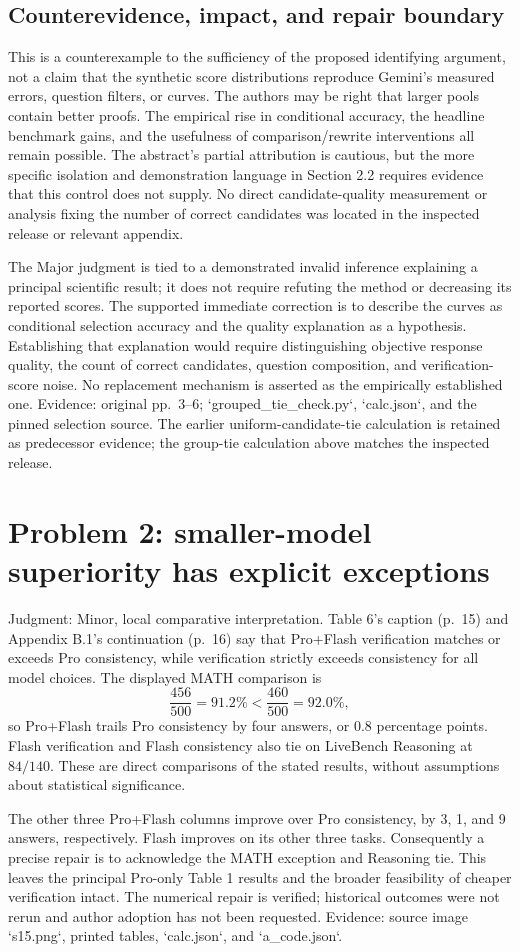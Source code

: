 \documentclass[10pt]{article}
\begin{document}
\subsection*{Counterevidence, impact, and repair boundary}
This is a counterexample to the sufficiency of the proposed identifying argument, not a claim that the synthetic score distributions reproduce Gemini’s measured errors, question filters, or curves. The authors may be right that larger pools contain better proofs. The empirical rise in conditional accuracy, the headline benchmark gains, and the usefulness of comparison/rewrite interventions all remain possible. The abstract’s partial attribution is cautious, but the more specific isolation and demonstration language in Section 2.2 requires evidence that this control does not supply. No direct candidate-quality measurement or analysis fixing the number of correct candidates was located in the inspected release or relevant appendix.\par
The Major judgment is tied to a demonstrated invalid inference explaining a principal scientific result; it does not require refuting the method or decreasing its reported scores. The supported immediate correction is to describe the curves as conditional selection accuracy and the quality explanation as a hypothesis. Establishing that explanation would require distinguishing objective response quality, the count of correct candidates, question composition, and verification-score noise. No replacement mechanism is asserted as the empirically established one. Evidence: original pp. 3–6; `grouped\_tie\_check.py`, `calc.json`, and the pinned selection source. The earlier uniform-candidate-tie calculation is retained as predecessor evidence; the group-tie calculation above matches the inspected release.\par
\section*{Problem 2: smaller-model superiority has explicit exceptions}
Judgment: Minor, local comparative interpretation. Table 6’s caption (p. 15) and Appendix B.1’s continuation (p. 16) say that Pro+Flash verification matches or exceeds Pro consistency, while verification strictly exceeds consistency for all model choices. The displayed MATH comparison is \[\frac{456}{500}=91.2\% < \frac{460}{500}=92.0\% ,\] so Pro+Flash trails Pro consistency by four answers, or 0.8 percentage points. Flash verification and Flash consistency also tie on LiveBench Reasoning at \(84/140\). These are direct comparisons of the stated results, without assumptions about statistical significance.\par
The other three Pro+Flash columns improve over Pro consistency, by 3, 1, and 9 answers, respectively. Flash improves on its other three tasks. Consequently a precise repair is to acknowledge the MATH exception and Reasoning tie. This leaves the principal Pro-only Table 1 results and the broader feasibility of cheaper verification intact. The numerical repair is verified; historical outcomes were not rerun and author adoption has not been requested. Evidence: source image `s15.png`, printed tables, `calc.json`, and `a\_code.json`.\par
\end{document}
